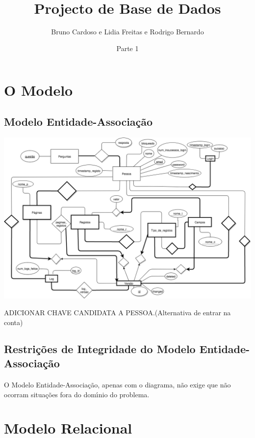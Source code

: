 \documentclass[11pt,a4paper]{article}
\title{\textbf{Projecto de Base de Dados}}
\author{Bruno Cardoso e Lidia Freitas e Rodrigo Bernardo}
\affil{Instituto Superior T\'{e}cnico}
\date{Parte 1}
\begin{document}
\setlength{\pdfpxdimen}{1in/250}
\maketitle

\newpage
\setcounter{page}{1}

\tableofcontents %
\newpage
\section{O Modelo}
\subsection{Modelo Entidade-Associa\c{c}\~ao}



\includegraphics[scale=0.48]{modelo-ea.png}


ADICIONAR CHAVE CANDIDATA A PESSOA.(Alternativa de entrar na conta)
\newpage
\subsection{Restri\c{c}\~oes de Integridade do Modelo Entidade-Associa\c{c}\~ao}

\paragraph{}

O Modelo Entidade-Associa\c{c}\~{a}o, apenas com o diagrama, n\~{a}o exige que n\~{a}o ocorram situa\c{c}\~{o}es fora do dom\'{\i}nio do problema.




\section{Modelo Relacional}
\end{document}
